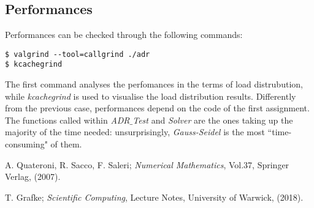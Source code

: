 \documentclass[11pt]{article}
\theoremstyle{theorem}
\theoremstyle{definition}
\begin{document}
\subsection{Performances}
\label{subsec:perf}
Performances can be checked through the following commands:
\begin{verbatim}
$ valgrind --tool=callgrind ./adr
$ kcachegrind
\end{verbatim}

The first command analyses the perfomances in the terms of load distrubution, while \emph{kcachegrind} is used to visualise the load distribution results. Differently from the previous case, performances depend on the code of the first assignment. The functions called within \emph{ADR$\_$Test} and \emph{Solver} are the ones taking up the majority of the time needed: unsurprisingly, \emph{Gauss-Seidel} is the most ``time-consuming" of them.\\


\cleardoublepage
\begin{thebibliography}{99}

 A. Quateroni, R. Sacco, F. Saleri;
\emph{Numerical Mathematics}, Vol.37, Springer Verlag, (2007).

 T. Grafke;
\emph{Scientific Computing}, Lecture Notes, University of Warwick, (2018).







\printindex
\end{thebibliography}
\end{document}
